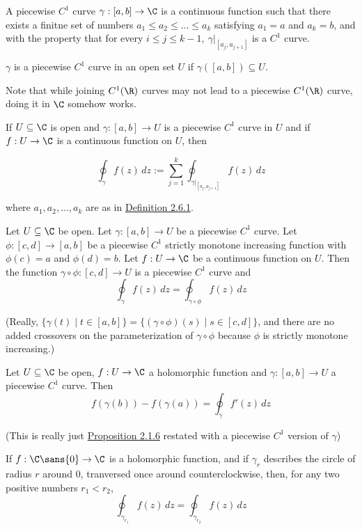 \label{baf22ac}

A piecewise $C^1$ curve $\gamma:[a,b]\to\C$ is a continuous function such that
there exists a finitne set of numbers $a_1\leq a_2\leq\ldots\leq a_k$
satisfying $a_1=a$ and $a_k=b$, and with the property that for every $i\leq
j\leq k-1,\ \gamma|_{[a_j,a_{j+1}]}$ is a $C^1$ curve.

$\gamma$ is a piecewise $C^1$ curve in an open set $U$ if
$\gamma([a,b])\subseteq U$.

Note that while joining $C^1(\R)$ curves may not lead to a piecewise $C^1(\R)$
curve, doing it in $\C$ somehow works.

\label{a99ad34}

If $U\subseteq\C$ is open and $\gamma:[a,b]\to U$ is a piecewise $C^1$ curve in
$U$ and if $f:U\to\C$ is a continuous function on $U$, then

$$
  \oint_\gamma f(z)\,dz:=\sum_{j=1}^k\oint_{\gamma|_{[a_j,a_{j+1}]}}
  f(z)\,dz
$$

where $a_1,a_2,\ldots,a_k$ are as in \href{baf22ac}{Definition 2.6.1}.

\label{b6b6d51}

Let $U\subseteq\C$ be open. Let $\gamma:[a,b]\to U$ be a piecewise $C^1$ curve.
Let $\phi:[c,d]\to[a,b]$ be a piecewise $C^1$ strictly monotone increasing
function with $\phi(c)=a$ and $\phi(d)=b$. Let $f:U\to\C$ be a continuous
function on $U$. Then the function $\gamma\circ\phi:[c,d]\to U$ is a piecewise
$C^1$ curve and
$$\oint_\gamma f(z)\,dz=\oint_{\gamma\circ\phi}f(z)\,dz$$

(Really, $\{\gamma(t)\mid t\in[a,b]\}=\{(\gamma\circ\phi)(s)\mid s
\in[c,d]\}$, and there are no added crossovers on the parameterization
of $\gamma\circ\phi$ because $\phi$ is strictly monotone increasing.)

\label{cd28a8f}

Let $U\subseteq\C$ be open, $f:U\to\C$ a holomorphic function and
$\gamma:[a,b]\to U$ a piecewise $C^1$ curve. Then
$$
  f(\gamma(b))-f(\gamma(a))=\oint_\gamma f'(z)\,dz
$$

(This is really just \href{c526c09}{Proposition 2.1.6} restated
with a piecewise $C^1$ version of $\gamma$)

\label{b52bca5}

If $f:\C\sans{0}\to\C$ is a holomorphic function, and if $\gamma_r$ describes
the circle of radius $r$ around $0$, tranversed once around counterclockwise,
then, for any two positive numbers $r_1<r_2$,
$$
  \oint_{\gamma_{r_1}}f(z)\,dz=\oint_{\gamma_{r_2}}f(z)\,dz
$$

